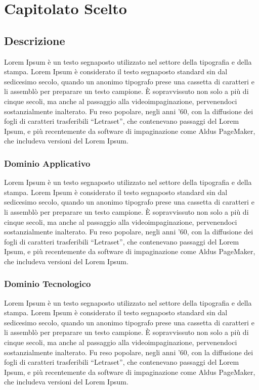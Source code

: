 \chapter{Capitolato Scelto}
\section{Descrizione}
Lorem Ipsum è un testo segnaposto utilizzato nel settore della tipografia e della stampa. Lorem Ipsum è considerato il testo segnaposto standard sin dal sedicesimo secolo, quando un anonimo tipografo prese una cassetta di caratteri e li assemblò per preparare un testo campione. È sopravvissuto non solo a più di cinque secoli, ma anche al passaggio alla videoimpaginazione, pervenendoci sostanzialmente inalterato. Fu reso popolare, negli anni ’60, con la diffusione dei fogli di caratteri trasferibili “Letraset”, che contenevano passaggi del Lorem Ipsum, e più recentemente da software di impaginazione come Aldus PageMaker, che includeva versioni del Lorem Ipsum.

\subsection{Dominio Applicativo}
Lorem Ipsum è un testo segnaposto utilizzato nel settore della tipografia e della stampa. Lorem Ipsum è considerato il testo segnaposto standard sin dal sedicesimo secolo, quando un anonimo tipografo prese una cassetta di caratteri e li assemblò per preparare un testo campione. È sopravvissuto non solo a più di cinque secoli, ma anche al passaggio alla videoimpaginazione, pervenendoci sostanzialmente inalterato. Fu reso popolare, negli anni ’60, con la diffusione dei fogli di caratteri trasferibili “Letraset”, che contenevano passaggi del Lorem Ipsum, e più recentemente da software di impaginazione come Aldus PageMaker, che includeva versioni del Lorem Ipsum.

\subsection{Dominio Tecnologico}
Lorem Ipsum è un testo segnaposto utilizzato nel settore della tipografia e della stampa. Lorem Ipsum è considerato il testo segnaposto standard sin dal sedicesimo secolo, quando un anonimo tipografo prese una cassetta di caratteri e li assemblò per preparare un testo campione. È sopravvissuto non solo a più di cinque secoli, ma anche al passaggio alla videoimpaginazione, pervenendoci sostanzialmente inalterato. Fu reso popolare, negli anni ’60, con la diffusione dei fogli di caratteri trasferibili “Letraset”, che contenevano passaggi del Lorem Ipsum, e più recentemente da software di impaginazione come Aldus PageMaker, che includeva versioni del Lorem Ipsum.

